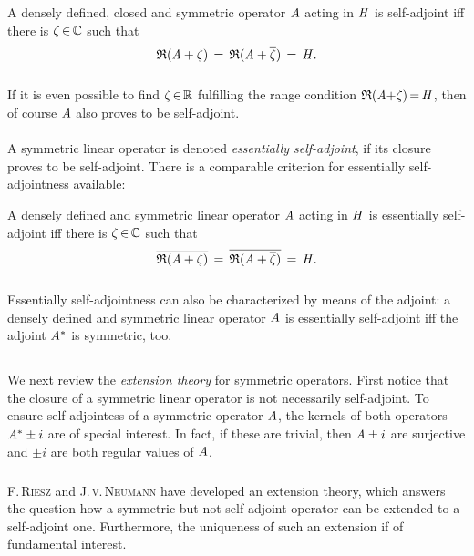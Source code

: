 \documentclass[11pt,twoside]{article}
\begin{document}
\begin{theorem}\label{RANGE_CONDITION}
A densely defined, closed and symmetric operator $\mathit{A}$
acting in $\mathit{H}$ is self-adjoint
iff there is $\zeta {\,\in\,} {\mathbb{C}}$ such that
\[
\mathfrak{R}(\mathit{A} + \zeta) \,=\, \mathfrak{R}(\mathit{A} + \overline{\zeta}) \,=\, \mathit{H}.
\]
\end{theorem}

\subparagraph{}
If it is even possible to find $\zeta {\,\in\,} {\mathbb{R}}$
fulfilling the range condition $\mathfrak{R}(\mathit{A} {+} \zeta) {\,=\,} \mathit{H}$,
then of course $\mathit{A}$ also proves to be self-adjoint.

\paragraph{} %
A symmetric linear operator is denoted \textit{essentially self-adjoint},
if its closure proves to be self-adjoint.
There is a comparable criterion for essentially self-adjointness available:

\begin{theorem}\label{RANGE_CONDITION_2}
A densely defined and symmetric linear operator $\mathit{A}$
acting in $\mathit{H}$ is essentially self-adjoint
iff there is $\zeta {\,\in\,} {\mathbb{C}}$ such that
\[
\overline{\mathfrak{R}(\mathit{A} + \zeta)} \,=\,
\overline{\mathfrak{R}(\mathit{A} + \overline{\zeta})} \,=\, \mathit{H}.
\]
\end{theorem}

\subparagraph{}
Essentially self-adjointness can also be characterized by means of the adjoint:
a densely defined and symmetric linear operator $\mathit{A}$ is essentially
self-adjoint
iff
the adjoint $\mathit{A}^*$ is symmetric, too.

\subsection{} %
We next review the \textit{extension theory} for symmetric operators.
First notice that
the closure of a symmetric linear operator is not necessarily self-adjoint.
To ensure self-adjointess of a symmetric operator $\mathit{A}$,
the kernels of both operators $\mathit{A}^* \pm i$ are of special interest.
In fact,
if these are trivial,
then $\mathit{A} \pm i$ are surjective and
$\pm i$ are both regular values of $\mathit{A}$.

\subparagraph{}
\textsc{F.\,Riesz} and \textsc{J.\,v.\,Neumann} 
have developed an extension theory,
which answers the question
how a symmetric but not self-adjoint operator can be extended
to a self-adjoint one.
Furthermore,
the uniqueness of such an extension if of fundamental interest.
\end{document}
